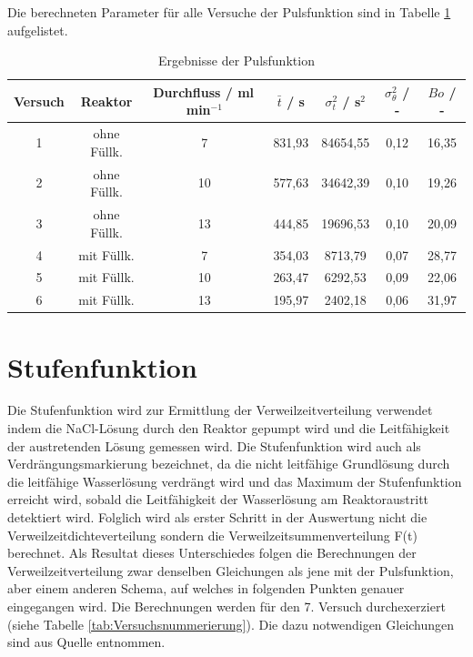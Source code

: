 \documentclass[12pt,liststotoc]{report}
\begin{document}
Die berechneten Parameter für alle Versuche der Pulsfunktion sind in Tabelle \ref{tab:werte_pulse} aufgelistet.

\begin{table}[H]
  \centering
  \caption{Ergebnisse der Pulsfunktion}
    \begin{tabular}{ccccccc}
    \toprule
    Versuch & Reaktor & Durchfluss / ml\,min$^{-1}$ & $\bar{t}$ / s & $\sigma_t^2$ / s$^2$ & $\sigma_{\theta}^2$ / - & $Bo$ / - \\
    \midrule
    
    1     & ohne Füllk. & 7     & 831,93 & 84654,55 & 0,12  & 16,35 \\
    2     & ohne Füllk. & 10    & 577,63 & 34642,39 & 0,10  & 19,26 \\
    3     & ohne Füllk. & 13    & 444,85 & 19696,53 & 0,10  & 20,09 \\
    4     & mit Füllk. & 7     & 354,03 & 8713,79 & 0,07  & 28,77 \\
    5     & mit Füllk. & 10    & 263,47 & 6292,53 & 0,09  & 22,06 \\
    6     & mit Füllk. & 13    & 195,97 & 2402,18 & 0,06  & 31,97 \\
    \bottomrule
    \end{tabular}%

  \label{tab:werte_pulse}%
\end{table}%

\newpage

\section{Stufenfunktion}

Die Stufenfunktion wird zur Ermittlung der Verweilzeitverteilung verwendet indem die NaCl-Lösung durch den Reaktor gepumpt wird und die Leitfähigkeit der austretenden Lösung gemessen wird. Die Stufenfunktion wird auch als Verdrängungsmarkierung bezeichnet, da die nicht leitfähige Grundlösung durch die leitfähige Wasserlösung verdrängt wird und das Maximum der Stufenfunktion erreicht wird, sobald die Leitfähigkeit der Wasserlösung am Reaktoraustritt detektiert wird. Folglich wird als erster Schritt in der Auswertung nicht die Verweilzeitdichteverteilung sondern die Verweilzeitsummenverteilung F(t) berechnet. Als Resultat dieses Unterschiedes folgen die Berechnungen der Verweilzeitverteilung zwar denselben Gleichungen als jene mit der Pulsfunktion, aber einem anderen Schema, auf welches in folgenden Punkten genauer eingegangen wird. Die Berechnungen werden für den 7. Versuch durchexerziert (siehe Tabelle \ref{tab:Versuchsnummerierung}). Die dazu notwendigen Gleichungen sind aus Quelle \cite{Skript_2018,Chem_Reaktion_2018} entnommen.
\end{document}
